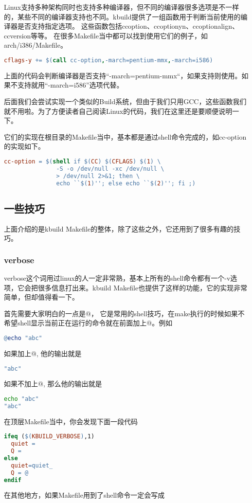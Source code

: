 Linux支持多种架构同时也支持多种编译器，但不同的编译器很多选项是不一样的，某些不同的编译器支持也不同。kbuild提供了一组函数用于判断当前使用的编译器是否支持指定选项。
这些函数包括cc\-option、cc\-option\-yn、cc\-option\-align、cc\-version等等。
在很多Makefile当中都可以找到使用它们的例子，如arch/i386/Makefile。
\begin{lstlisting}[language=make]
cflags-y += $(call cc-option,-march=pentium-mmx,-march=i586)
\end{lstlisting}
上面的代码会判断编译器是否支持“-march=pentium-mmx“，如果支持则使用。如果不支持就用“-march=i586”选项代替。

后面我们会尝试实现一个类似的Build系统，但由于我们只用GCC，这些函数我们就不用啦。为了方便读者自己阅读Linux的代码，我们在这里还是要顺便说明一下。


它们的实现在根目录的Makefile当中，基本都是通过shell命令完成的，如cc-option的实现如下。
\begin{lstlisting}[language=make]
cc-option = $(shell if $(CC) $(CFLAGS) $(1) \
               -S -o /dev/null -xc /dev/null \
               > /dev/null 2>&1; then \
               echo ``$(1)''; else echo ``$(2)''; fi ;)

\end{lstlisting}
\subsection{一些技巧}
上面介绍的是kbuild Makefile的整体，除了这些之外，它还用到了很多有趣的技巧。
\subsubsection{verbose}
verbose这个词用过linux的人一定非常熟，基本上所有的shell命令都有一个-v选项，它会把很多信息打出来。kbuild Makefile也提供了这样的功能，它的实现非常简单，但却值得看一下。

首先需要大家明白的一点是@， 它是常用的shell技巧，在make执行的时候如果不希望shell显示当前正在运行的命令就在前面加上@。例如
\begin{lstlisting}[language=make]
@echo "abc"
\end{lstlisting}
如果加上@, 他的输出就是
\begin{lstlisting}[language=bash]
"abc"
\end{lstlisting}
如果不加上@, 那么他的输出就是
\begin{lstlisting}[language=bash]
echo "abc"
"abc"
\end{lstlisting}

在顶层Makefile当中，你会发现下面一段代码
\begin{lstlisting}[language=make]
ifeq ($(KBUILD_VERBOSE),1)
  quiet =
  Q =
else
  quiet=quiet_
  Q = @
endif
\end{lstlisting}
在其他地方，如果Makefile用到了shell命令一定会写成

